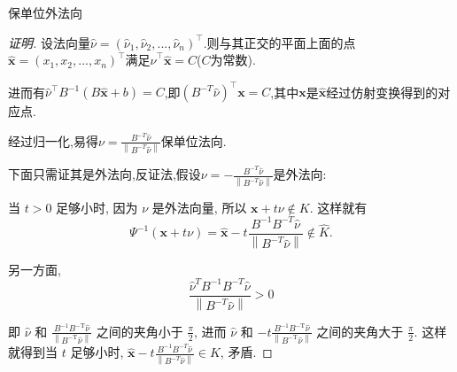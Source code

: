 \documentclass[12pt,a4paper]{article}
\begin{document}
\begin{enumerate}
		保单位外法向
		
		\begin{proof}[证明]
			设法向量$\widehat{\nu}=(\widehat{\nu}_1,\widehat{\nu}_2,...,\widehat{\nu}_n)^\top$.则与其正交的平面上面的点$\widehat{\boldsymbol{x}}=(x_1,x_2,...,x_n)^\top$满足$\widehat{\nu}^\top \widehat{\boldsymbol{x}}=C$($C$为常数).
			
			进而有$\widehat{\nu}^\top B^{-1} (B\widehat{\boldsymbol{x}}+b)=C$,即$(B^{-T} \widehat{\nu})^\top \boldsymbol{x}=C$,其中$\boldsymbol{x}$是$\widehat{\boldsymbol{x}}$经过仿射变换得到的对应点.
			
			经过归一化,易得$
			\nu=\frac{B^{-T} \widehat{\nu}}{\left\|B^{-T} \widehat{\nu}\right\|}
			$保单位法向.
			
			下面只需证其是外法向,反证法,假设$
			\nu=-\frac{B^{-T} \widehat{\nu}}{\left\|B^{-T} \widehat{\nu}\right\|}
			$是外法向:
			
			当 $t>0$ 足够小时, 因为 $\nu$ 是外法向量, 所以 $\boldsymbol{x}+t \nu \notin K$. 这样就有
			$$
			\Psi^{-1}(\boldsymbol{x}+t \nu)=\widehat{\boldsymbol{x}}-t \frac{B^{-1} B^{-{T}} \widehat{\nu}}{\left\|B^{-{T}} \widehat{\nu}\right\|} \notin \hat{K} .
			$$
			
			另一方面,
			$$
			\frac{\hat{\nu}^{{T}} {B}^{-1} {B}^{-{T}} \widehat{{\nu}}}{\left\|{B}^{-{T}} \widehat{{\nu}}\right\|}>0
			$$
			
			即 $\hat{\nu}$ 和 $\frac{B^{-1} B^{-\mathrm{T}} \hat{\nu}}{\left\|B^{-\mathrm{T}} \hat{\nu}\right\|}$ 之间的夹角小于 $\frac{\pi}{2}$, 进而 $\hat{\nu}$ 和 $-t \frac{B^{-1} B^{-\mathrm{T}} \hat{\nu}}{\left\|B^{-\mathrm{T}} \hat{\nu}\right\|}$ 之间的夹角大于 $\frac{\pi}{2}$. 这样就得到当 $t$ 足够小时, $\hat{\boldsymbol{x}}-t \frac{{B}^{-1} {B}^{-{T}} \hat{{\nu}}}{\left\|{B}^{-{T}} \hat{{\nu}}\right\|} \in K$, 矛盾.
		\end{proof}
	\end{enumerate}
	
	
\end{document}
